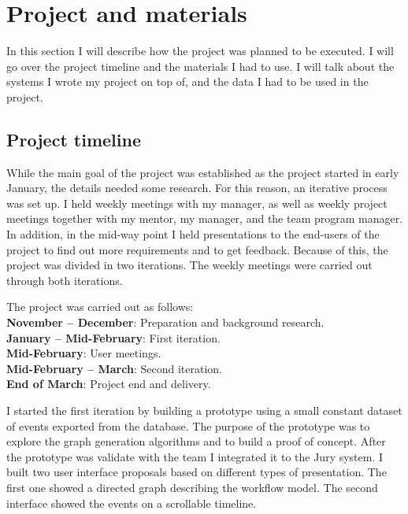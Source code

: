 
\clearpage
\section{Project and materials}
\label{sec:materials}

In this section I will describe how the project was planned to be executed.
I will go over the project timeline and the materials I had to use.
I will talk about the systems I wrote my project on top of, and the data I had to be used in the project.

\subsection{Project timeline}
\label{sec:timeline}
While the main goal of the project was established as the project started in early January,
the details needed some research. For this reason, an iterative process was set up.
I held weekly meetings with my manager, as well as weekly project meetings together with my mentor, my manager, and the team program manager. In addition, in the mid-way point I held presentations to the end-users of the project to find out more requirements and to get feedback. Because of this, the project was divided in two iterations.
The weekly meetings were carried out through both iterations.

The project was carried out as follows:\\
\textbf{November -- December}: Preparation and background research.\\
\textbf{January -- Mid-February}: First iteration.\\
\textbf{Mid-February}: User meetings.\\
\textbf{Mid-February -- March}: Second iteration.\\
\textbf{End of March}: Project end and delivery.\\

I started the first iteration by building a prototype using a small constant dataset of events exported from the database. The purpose of the prototype was to explore the graph generation algorithms and to build a proof of concept. After the prototype was validate with the team I integrated it to the Jury system. I built two user interface proposals based on different types of presentation. The first one showed a directed graph describing the workflow model. The second interface showed the events on a scrollable timeline.

